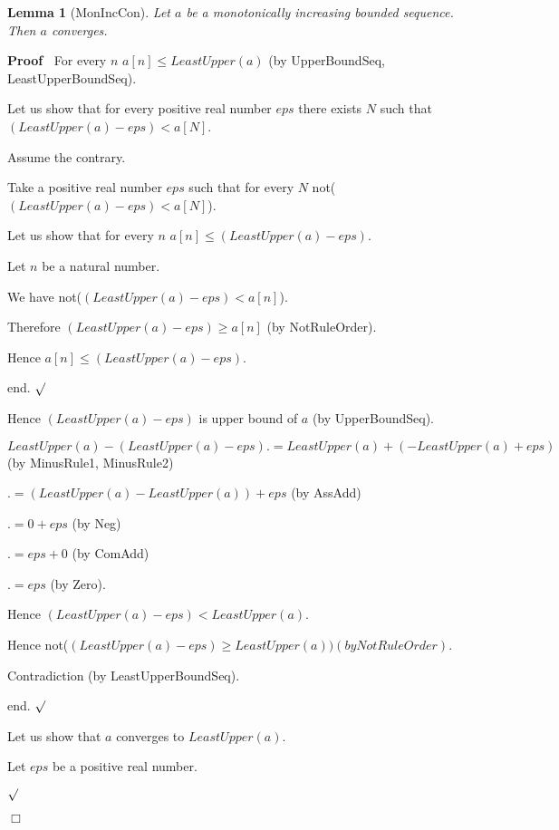 \documentclass{article}
\newenvironment{forthel}{\begin{leftbar}}{\end{leftbar}}
\newenvironment{proof}{\noindent\textbf{Proof\ }}{\hspace*{\fill}$\Box$\medskip}
\newenvironment{subproof}{\begin{list}{}{}
		\item[\text{Proof}]}{\hfill $\surd$ \end{list}}
\newtheorem{lemma}{Lemma}
\begin{document}
\begin{forthel}
	\begin{lemma}[MonIncCon]
		Let $a$ be a monotonically increasing bounded sequence. Then $a$ converges.
	\end{lemma}
	
	\begin{proof}
		For every $n$ $a[n] \leq LeastUpper(a)$ (by UpperBoundSeq, LeastUpperBoundSeq).
		
		Let us show that for every positive real number $eps$ there exists $N$ such that $(LeastUpper(a) - eps) < a[N]$.
		
		\begin{subproof}
			Assume the contrary.
			
			Take a positive real number $eps$ such that for every $N$ not($(LeastUpper(a) - eps) < a[N]$).
			
			Let us show that for every $n$ $a[n] \leq (LeastUpper(a) - eps)$.
			
			\begin{subproof}
				Let $n$ be a natural number.
				
				We have not($(LeastUpper(a) - eps) < a[n]$).
				
				Therefore $(LeastUpper(a) - eps) \geq a[n]$ (by NotRuleOrder).
				
				Hence $a[n] \leq (LeastUpper(a) - eps)$.
				
				end.
			\end{subproof}
			
			Hence $(LeastUpper(a) - eps)$ is upper bound of $a$ (by UpperBoundSeq).
			
			$LeastUpper(a) - (LeastUpper(a) - eps) .= LeastUpper(a) + (-LeastUpper(a) + eps)$ (by MinusRule1, MinusRule2)
			
			$.= (LeastUpper(a) - LeastUpper(a)) + eps$ (by AssAdd)
			
			$.= 0 + eps$ (by Neg)
			
			$.= eps + 0$ (by ComAdd)
			
			$.= eps$ (by Zero).
			
			Hence $(LeastUpper(a) - eps) < LeastUpper(a)$.
			
			Hence not($(LeastUpper(a) - eps) \geq LeastUpper(a)) (by NotRuleOrder)$.
			
			Contradiction (by LeastUpperBoundSeq).
			
			end.
		\end{subproof}
		
		Let us show that $a$ converges to $LeastUpper(a)$.
		
		\begin{subproof}
			Let $eps$ be a positive real number.
			

\end{subproof}
\end{proof}
\end{forthel}
\end{document}
